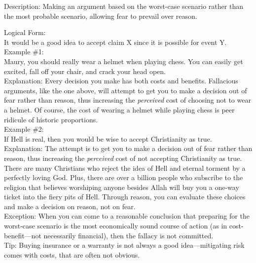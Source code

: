 \documentclass[a4paper,12pt,single,pdftex]{scrartcl}
\begin{document}
  
    Description: Making an argument based on the worst-case scenario rather than the most probable scenario, allowing fear to prevail over reason.

    
      Logical Form:
    \\

    
      It would be a good idea to accept claim X since it is possible for event Y.
    \\

    
      Example \#1:
    \\

    
      Maury, you should really wear a helmet when playing chess.  You can easily get excited, fall off your chair, and crack your head open.
    \\

    
      Explanation: Every decision you make has both costs and benefits.  Fallacious arguments, like the one above, will attempt to get you to make a decision out of fear rather than reason, thus increasing the {\it perceived}  cost of choosing not to wear a helmet.  Of course, the cost of wearing a helmet while playing chess is peer ridicule of historic proportions.
    \\

    
      Example \#2:
    \\

    
      If Hell is real, then you would be wise to accept Christianity as true.
    \\

    
      Explanation: The attempt is to get you to make a decision out of fear rather than reason, thus increasing the {\it perceived} cost of not accepting Christianity as true.  There are many Christians who reject the idea of Hell and eternal torment by a perfectly loving God.  Plus, there are over a billion people who subscribe to the religion that believes worshiping anyone besides Allah will buy you a one-way ticket into the fiery pits of Hell.  Through reason, you can evaluate these choices and make a decision on reason, not on fear.
    \\

    
      Exception: When you can come to a reasonable conclusion that preparing for the worst-case scenario is the most economically sound course of action (as in cost-benefit—not necessarily financial), then the fallacy is not committed.
    \\

    
      Tip: Buying insurance or a warranty is not always a good idea—mitigating risk comes with costs, that are often not obvious.
    \\
\end{document}
